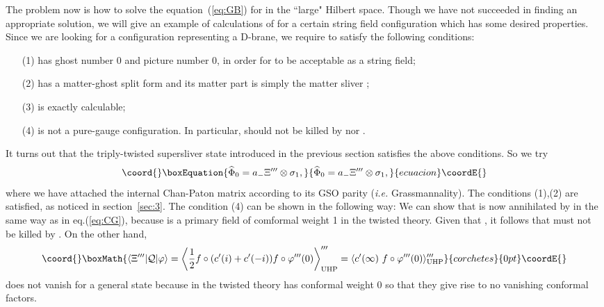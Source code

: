 \documentclass[a4paper,12pt]{article}
\providecommand{\cQ}{\mathcal{Q}}
\providecommand{\tp}{\prime\prime\prime}
\begin{document}
The problem now is how to solve the equation~(\ref{eq:GB}) for \myHighlight{$\widehat{\Phi}$}\coordHE{} in the ``large" Hilbert space. 
Though we have not succeeded in finding an appropriate solution, we will give an example of calculations 
of \myHighlight{$e^{-\widehat{\Phi}}\widehat{\cQ}e^{\widehat{\Phi}}$}\coordHE{} for a certain string field configuration 
\coordHE{} which has some desired properties. Since we are looking for a configuration 
representing a D-brane, we require \coordHE{} to satisfy the following conditions: 
\begin{itemize}
\item[(1)] \coordHE{} has ghost number 0 and picture number 0, in order for \coordHE{} 
to be acceptable as a string field;
\item[(2)] \coordHE{} has a matter-ghost split form and its matter part is simply the 
matter sliver \coordHE{};
\item[(3)] \myHighlight{$e^{-\widehat{\Phi}_0}\widehat{\cQ}e^{\widehat{\Phi}_0}$}\coordHE{} is exactly calculable;
\item[(4)] \coordHE{} is not a pure-gauge configuration. In particular, \coordHE{} 
should not be killed by \coordHE{} nor \myHighlight{$\widehat{\cQ}$}\coordHE{}.
\end{itemize}
It turns out that the triply-twisted supersliver state \myHighlight{$\Xi^{\tp}$}\coordHE{} introduced in the previous section 
satisfies the above conditions. So we try  
\begin{equation}\coord{}\boxEquation{
\widehat{\Phi}_0=a_-\Xi^{\tp}\otimes\sigma_1, \label{eq:GC}
}{
\widehat{\Phi}_0=a_-\Xi^{\tp}\otimes\sigma_1, }{ecuacion}\coordE{}\end{equation}
where we have attached the internal Chan-Paton matrix \coordHE{} according to its GSO parity (\textit{i.e.} 
Grassmannality). The conditions (1),(2) are satisfied, as noticed in section~\ref{sec:3}. 
The condition (4) can be shown in the following way: 
We can show that \myHighlight{$\Xi^{\tp}$}\coordHE{} is now annihilated 
by \coordHE{} in the same way as in eq.(\ref{eq:CG}), because \coordHE{} is a primary field 
of comformal weight 1 in the twisted theory. Given that \coordHE{}, it follows that 
\myHighlight{$\Xi^{\tp}$}\coordHE{} must not be killed by \coordHE{}. On the other hand, 
\[\coord{}\boxMath{ \langle\Xi^{\tp}|\cQ|\varphi\rangle=\left\langle\frac{1}{2}f\circ(c^{\prime}(i)+c^{\prime}(-i))
f\circ\varphi^{\tp}(0)\right\rangle^{\tp}_{\mathrm{UHP}}=\langle c^{\prime}(\infty)\ f\circ\varphi^{\tp}(0)
\rangle^{\tp}_{\mathrm{UHP}} }{corchetes}{0pt}\coordE{}\]
does not vanish for a general state \myHighlight{$|\varphi\rangle$}\coordHE{} 
because \coordHE{} in the twisted theory has 
conformal weight 0 so that they give rise to no vanishing conformal factors. 
\smallskip
\end{document}
